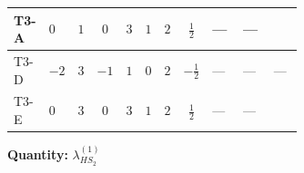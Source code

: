 \documentclass[8pt]{article}
\begin{document}
\begin{landscape}
\begin{longtable}{@{}llcccccc >{\raggedright\arraybackslash}p{0.21\linewidth} >{\raggedright\arraybackslash}p{0.21\linewidth} >{\raggedright\arraybackslash}p{0.21\linewidth}@{}}
\midrule
T3-A & $0$ & $1$ & $0$ & $3$ & $1$ & $2$ & $\frac{1}{2}$ & --- & --- & \scriptsize\adjustbox{max width=\linewidth}{$\begin{gathered} {\lambda_{HS_2}^{(1)}} (2 T_{\nu}^{(2)}+6 \operatorname{Tr}\!\left({Y_d}\,\left({Y_d}\right)^{\dagger}\right)+2 \operatorname{Tr}\!\left({Y_e}\,\left({Y_e}\right)^{\dagger}\right)+6 \operatorname{Tr}\!\left({Y_u}\,\left({Y_u}\right)^{\dagger}\right)+4 {\lambda_{S_2}^{(A)}})\end{gathered}$} \\
\midrule
T3-D & $-2$ & $3$ & $-1$ & $1$ & $0$ & $2$ & $-\frac{1}{2}$ & --- & --- & --- \\
\midrule
T3-E & $0$ & $3$ & $0$ & $3$ & $1$ & $2$ & $\frac{1}{2}$ & --- & --- & \scriptsize\adjustbox{max width=\linewidth}{$\begin{gathered} {\lambda_{HS_2}^{(1)}} (2 T_{\nu}^{(2)}+6 \operatorname{Tr}\!\left({Y_d}\,\left({Y_d}\right)^{\dagger}\right)+2 \operatorname{Tr}\!\left({Y_e}\,\left({Y_e}\right)^{\dagger}\right)+6 \operatorname{Tr}\!\left({Y_u}\,\left({Y_u}\right)^{\dagger}\right)+4 {\lambda_{S_2}^{(A)}})\end{gathered}$} \\
\midrule
\bottomrule
\end{longtable}
\clearpage
\noindent\textbf{Quantity: }$\lambda_{HS_2}^{(1)}$\par\smallskip

\end{landscape}
\end{document}
